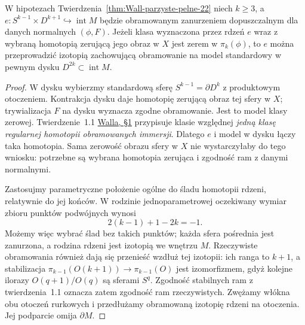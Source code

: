 \begin{lemat}
\label{lem:wall-zero-do-dysku-22}
W hipotezach Twierdzenia~\ref{thm:Wall-parzyste-pelne-22}
niech $k\geq3$, a
$e:S^{k-1}\times D^{k+1}\hookrightarrow\operatorname{int}M$
będzie obramowanym zanurzeniem dopuszczalnym dla
danych normalnych $(\phi,F)$. Jeżeli klasa
wyznaczona przez rdzeń $e$ wraz z wybraną
homotopią zerującą jego obraz w $X$ jest zerem
w $\pi_k(\phi)$, to $e$ można przeprowadzić
izotopią zachowującą obramowanie na model
standardowy w pewnym dysku
$D^{2k}\subset\operatorname{int}M$.
\end{lemat}
\begin{proof}
W dysku wybierzmy standardową sferę
$S^{k-1}=\partial D^k$ z produktowym otoczeniem.
Kontrakcja dysku daje homotopię zerującą
obraz tej sfery w $X$; trywializacja $F$
na dysku wyznacza zgodne obramowanie.
Jest to model klasy zerowej.
Twierdzenie~1.1
\href{https://www.maths.ed.ac.uk/~v1ranick/books/scm.pdf}
{Walla, §1} przypisuje klasie względnej
\emph{jedną klasę regularnej homotopii
obramowanych immersji}. Dlatego $e$ i model
w dysku łączy taka homotopia. Sama zerowość
obrazu sfery w $X$ nie wystarczyłaby do
tego wniosku: potrzebne są wybrana homotopia
zerująca i zgodność ram z danymi normalnymi.

Zastosujmy parametryczne położenie ogólne
do śladu homotopii rdzeni, relatywnie do
jej końców. W rodzinie jednoparametrowej
oczekiwany wymiar zbioru punktów podwójnych
wynosi
\[
 2(k-1)+1-2k=-1.
\]
Możemy więc wybrać ślad bez takich punktów;
każda sfera pośrednia jest zanurzona, a rodzina
rdzeni jest izotopią we wnętrzu $M$.
Rzeczywiste obramowania również dają się
przenieść wzdłuż tej izotopii: ich ranga to
$k+1$, a stabilizacja
$\pi_{k-1}(O(k+1))\to\pi_{k-1}(O)$
jest izomorfizmem, gdyż kolejne ilorazy
$O(q+1)/O(q)$ są sferami $S^q$.
Zgodność stabilnych ram z twierdzenia~1.1
oznacza zatem zgodność ram rzeczywistych.
Zwężamy włókna obu otoczeń rurkowych i
przedłużamy obramowaną izotopię rdzeni
na otoczenia. Jej podparcie omija $\partial M$.
\end{proof}

